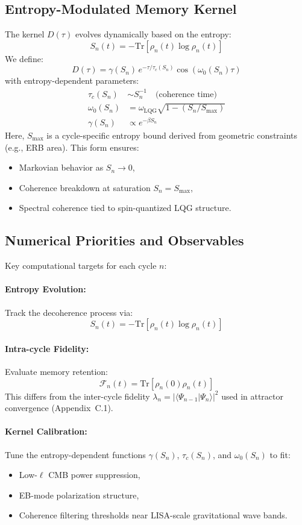 \subsection*{Entropy-Modulated Memory Kernel}

The kernel \( D(\tau) \) evolves dynamically based on the entropy:
\[
S_n(t) = -\mathrm{Tr}[\rho_n(t) \log \rho_n(t)]
\]
We define:
\[
D(\tau) = \gamma(S_n) \, e^{-\tau/\tau_c(S_n)} \cos(\omega_0(S_n) \tau)
\]
with entropy-dependent parameters:
\begin{align*}
\tau_c(S_n) &\sim S_n^{-1} \quad \text{(coherence time)} \\
\omega_0(S_n) &= \omega_{\text{LQG}} \sqrt{1 - \left(S_n / S_{\text{max}}\right)} \\
\gamma(S_n) &\propto e^{-\beta S_n}
\end{align*}
Here, \( S_{\text{max}} \) is a cycle-specific entropy bound derived from geometric constraints (e.g., ERB area). This form ensures:
\begin{itemize}
  \item Markovian behavior as \( S_n \to 0 \),
  \item Coherence breakdown at saturation \( S_n = S_{\text{max}} \),
  \item Spectral coherence tied to spin-quantized LQG structure.
\end{itemize}

\subsection*{Numerical Priorities and Observables}

Key computational targets for each cycle \( n \):

\paragraph{Entropy Evolution:}
Track the decoherence process via:
\[
S_n(t) = -\mathrm{Tr}[\rho_n(t) \log \rho_n(t)]
\]

\paragraph{Intra-cycle Fidelity:}
Evaluate memory retention:
\[
\mathcal{F}_n(t) = \mathrm{Tr}[\rho_n(0)\rho_n(t)]
\]
This differs from the inter-cycle fidelity \( \lambda_n = |\langle \Psi_{n-1} | \Psi_n \rangle|^2 \) used in attractor convergence (Appendix~C.1).

\paragraph{Kernel Calibration:}
Tune the entropy-dependent functions \( \gamma(S_n) \), \( \tau_c(S_n) \), and \( \omega_0(S_n) \) to fit:
\begin{itemize}
  \item Low-\( \ell \) CMB power suppression,
  \item EB-mode polarization structure,
  \item Coherence filtering thresholds near LISA-scale gravitational wave bands.
\end{itemize}

